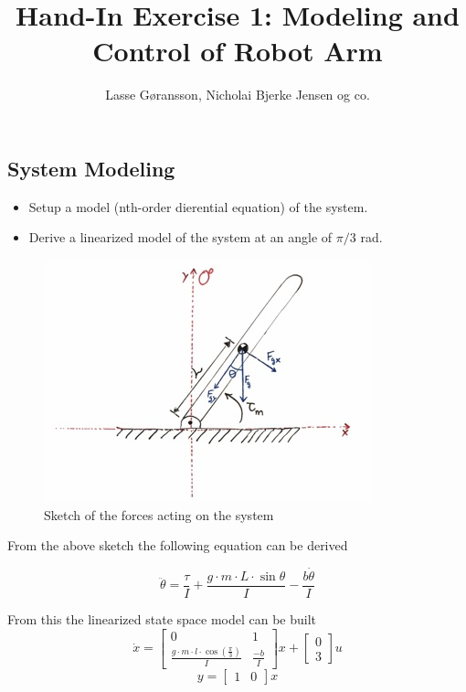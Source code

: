 \documentclass[12pt]{article}
\begin{document}
\title{Hand-In Exercise 1: Modeling and Control of Robot Arm}
\author{Lasse Gøransson, Nicholai Bjerke Jensen og co.}

\maketitle
\normalsize


\subsection*{System Modeling}
\begin{itemize}
  \item Setup a model (nth-order dierential equation) of the system.
  \item Derive a linearized model of the system at an angle of $\pi/3$ rad.
\end{itemize}

\begin{figure}[H]
  \includegraphics{images/HandInAssignment1REG.png}
  \caption{Sketch of the forces acting on the system}
  \label{}
\end{figure}

From the above sketch the following equation can be derived

\begin{equation}
  \ddot{\theta} = \frac{\tau}{I} + \frac{g\cdot m \cdot L \cdot \sin \theta}{I} - \frac{b\dot{\theta}}{I}
\end{equation}

From this the linearized state space model can be built
\begin{equation}
  \dot{x} = \left[\begin{array}{cc} 0 & 1\\ \frac{g\cdot m\cdot l\cdot\cos(\frac{\pi}{3})}{I} & \frac{-b}{I} \end{array}\right]x+ \left[\begin{array}{c} 0\\ 3 \end{array}\right]u
\end{equation}
\begin{equation}
  y = \left[\begin{array}{cc} 1 & 0 \end{array}\right]x
\end{equation}
\end{document}
